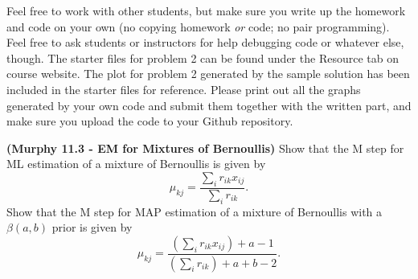 \documentclass[12pt,letterpaper,fleqn]{hmcpset}
\begin{document}
Feel free to work with other students, but make sure you write up the homework
and code on your own (no copying homework \textit{or} code; no pair programming).
Feel free to ask students or instructors for help debugging code or whatever else,
though.
\newline
\newline
The starter files for problem 2 can be found under the Resource tab on course website. The plot for problem 2 generated by the sample solution has been included in the starter files for reference. Please print out all the graphs generated by your own code and submit them together with the written part, and make sure you upload the code to your Github repository.

\begin{problem}[1]
\textbf{(Murphy 11.3 - EM for Mixtures of Bernoullis)} Show that the M step for ML estimation
of a mixture of Bernoullis is given by
\[
    \mu_{kj} = \frac{\sum_i r_{ik}x_{ij}}{\sum_i r_{ik}}.
\]
Show that the M step for MAP estimation of a mixture of Bernoullis with a $\beta(a,b)$ prior
is given by
\[
    \mu_{kj} = \frac{\left(\sum_i r_{ik}x_{ij}\right) + a - 1}{\left(\sum_i r_{ik}\right) + a + b - 2}.
\]
\end{problem}
\end{document}
